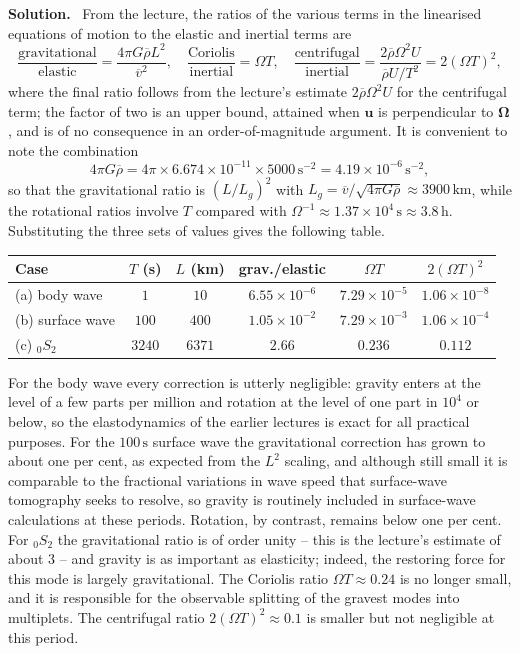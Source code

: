 \documentclass[a4paper,12pt]{paper}
\newenvironment{solution}{\par\noindent\textbf{Solution.}\ }{\par\medskip}
\begin{document}
\begin{solution}
From the lecture, the ratios of the various terms in the linearised equations of motion to the
elastic and inertial terms are
\begin{equation}
\frac{\text{gravitational}}{\text{elastic}}=\frac{4\pi G\overline{\rho}L^{2}}{\overline{v}^{2}},\quad
\frac{\text{Coriolis}}{\text{inertial}}=\Omega T,\quad
\frac{\text{centrifugal}}{\text{inertial}}=\frac{2\overline{\rho}\Omega^{2}U}{\overline{\rho}U/T^{2}}=2(\Omega T)^{2},
\label{eq:22}
\end{equation}
where the final ratio follows from the lecture's estimate $2\overline{\rho}\Omega^{2}U$ for the
centrifugal term; the factor of two is an upper bound, attained when $\mathbf{u}$ is perpendicular to
$\bm{\Omega}$, and is of no consequence in an order-of-magnitude argument. It is convenient to note the
combination
\begin{equation}
4\pi G\overline{\rho}=4\pi\times6.674\times10^{-11}\times5000\,\mathrm{s^{-2}}=4.19\times10^{-6}\,\mathrm{s^{-2}},
\label{eq:23}
\end{equation}
so that the gravitational ratio is $(L/L_{g})^{2}$ with
$L_{g}=\overline{v}/\sqrt{4\pi G\overline{\rho}}\approx3900\,\mathrm{km}$, while the rotational ratios
involve $T$ compared with $\Omega^{-1}\approx1.37\times10^{4}\,\mathrm{s}\approx3.8\,\mathrm{h}$.
Substituting the three sets of values gives the following table.
\begin{center}
\small
\begin{tabular}{lccccc}
\hline
Case & $T$ (s) & $L$ (km) & grav./elastic & $\Omega T$ & $2(\Omega T)^{2}$ \\
\hline
(a) body wave & $1$ & $10$ & $6.55\times10^{-6}$ & $7.29\times10^{-5}$ & $1.06\times10^{-8}$ \\
(b) surface wave & $100$ & $400$ & $1.05\times10^{-2}$ & $7.29\times10^{-3}$ & $1.06\times10^{-4}$ \\
(c) $_{0}S_{2}$ & $3240$ & $6371$ & $2.66$ & $0.236$ & $0.112$ \\
\hline
\end{tabular}
\end{center}
For the body wave every correction is utterly negligible: gravity enters at the level of a few parts
per million and rotation at the level of one part in $10^{4}$ or below, so the elastodynamics of the
earlier lectures is exact for all practical purposes. For the $100\,\mathrm{s}$ surface wave the
gravitational correction has grown to about one per cent, as expected from the $L^{2}$ scaling,
and although still small it is comparable to the fractional variations in wave speed that surface-wave
tomography seeks to resolve, so gravity is routinely included in surface-wave calculations at these
periods. Rotation, by contrast, remains below one per cent. For $_{0}S_{2}$ the gravitational ratio is
of order unity -- this is the lecture's estimate of about $3$ -- and gravity is as important as
elasticity; indeed, the restoring force for this mode is largely gravitational. The Coriolis ratio
$\Omega T\approx0.24$ is no longer small, and it is responsible for the observable splitting of the
gravest modes into multiplets. The centrifugal ratio $2(\Omega T)^{2}\approx0.1$ is smaller but not
negligible at this period.


\end{solution}
\end{document}
